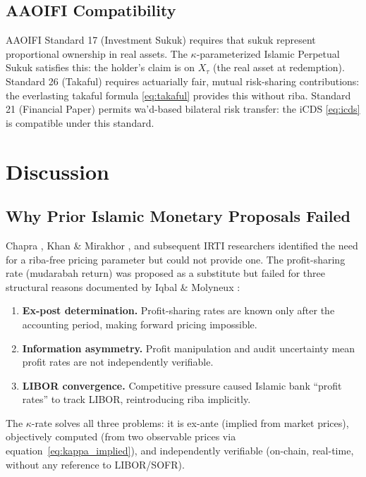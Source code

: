 \documentclass[10pt,twocolumn]{article}
\theoremstyle{plain}
\theoremstyle{definition}
\begin{document}
\subsection{AAOIFI Compatibility}

AAOIFI Standard 17 (Investment Sukuk) requires that sukuk
represent proportional ownership in real assets. The
$\kappa$-parameterized Islamic Perpetual Sukuk satisfies
this: the holder's claim is on $X_\tau$ (the real asset
at redemption). Standard 26 (Takaful) requires actuarially
fair, mutual risk-sharing contributions: the everlasting
takaful formula \eqref{eq:takaful} provides this without
riba. Standard 21 (Financial Paper) permits wa'd-based
bilateral risk transfer: the iCDS \eqref{eq:icds} is
compatible under this standard.

\section{Discussion}
\label{sec:discussion}

\subsection{Why Prior Islamic Monetary Proposals Failed}

Chapra \cite{Chapra1985}, Khan \& Mirakhor \cite{KhanMirakhor1987},
and subsequent IRTI researchers identified the need for a
riba-free pricing parameter but could not provide one.
The profit-sharing rate (mudarabah return) was proposed as a
substitute but failed for three structural reasons documented
by Iqbal \& Molyneux \cite{IqbalMolyneux2005}:
\begin{enumerate}[leftmargin=*, noitemsep]
\item \textbf{Ex-post determination.} Profit-sharing rates are
known only after the accounting period, making forward pricing
impossible.
\item \textbf{Information asymmetry.} Profit manipulation and
audit uncertainty mean profit rates are not independently
verifiable.
\item \textbf{LIBOR convergence.} Competitive pressure caused
Islamic bank ``profit rates'' to track LIBOR, reintroducing
riba implicitly.
\end{enumerate}

The $\kappa$-rate solves all three problems: it is ex-ante
(implied from market prices), objectively computed (from two
observable prices via equation~\eqref{eq:kappa_implied}),
and independently verifiable (on-chain, real-time, without
any reference to LIBOR/SOFR).
\end{document}
